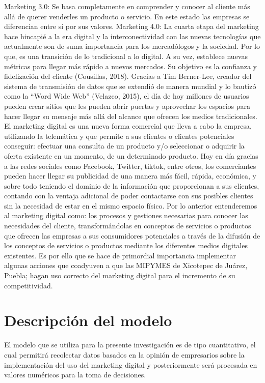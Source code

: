 \documentclass[12pt]{difu100cia} %
\begin{document}
Marketing 3.0: Se basa completamente en comprender y conocer al cliente más allá de querer venderles un producto o servicio. En este estado las empresas se diferencian entre sí por sus valores. 
Marketing 4.0: La cuarta etapa del marketing hace hincapié a la era digital y la interconectividad con las nuevas tecnologías que actualmente son de suma importancia para los mercadólogos y la sociedad. Por lo que, es una transición de lo tradicional a lo digital. A su vez, establece nuevas métricas para llegar más rápido a nuevos mercados. Su objetivo es la confianza y fidelización del cliente (Cousillas, 2018).
Gracias a Tim Berner-Lee, creador del sistema de transmisión de datos que se extendió de manera mundial y lo bautizó como la “Word Wide Web”  (Velazco, 2015), el día de hoy millones de usuarios pueden crear sitios que les pueden abrir puertas y aprovechar los espacios para hacer llegar su mensaje más allá del alcance que ofrecen los medios tradicionales. 
El marketing digital es una nueva forma comercial que lleva a cabo la empresa, utilizando la telemática y que permite a sus clientes o clientes potenciales conseguir: efectuar una consulta de un producto y/o seleccionar o adquirir la oferta existente en un momento, de un determinado producto. 
Hoy en día gracias a las redes sociales como Facebook, Twitter, tiktok, entre otros, los comerciantes pueden hacer llegar su publicidad de una manera más fácil, rápida, económica, y sobre todo teniendo el dominio de la información que proporcionan a sus clientes, contando con la ventaja adicional de poder contactarse con sus posibles clientes sin la necesidad de estar en el mismo espacio físico. 
Por lo anterior entenderemos al marketing digital como: los procesos y gestiones necesarias para conocer las necesidades del cliente, transformándolas en conceptos de servicios o productos que ofrecen las empresas a sus consumidores potenciales a través de la difusión de los conceptos de servicios o productos mediante los diferentes medios digitales existentes. Es por ello que se hace de primordial importancia implementar algunas acciones que coadyuven a que las MIPYMES de Xicotepec de Juárez, Puebla; hagan uso correcto del marketing digital para el incremento de su competitividad.

\section{Descripción del modelo}

El modelo que se utiliza para la presente investigación es de tipo cuantitativo, el cual permitirá recolectar datos basados en la opinión de empresarios sobre la implementación del uso del marketing digital y posteriormente será procesada en valores numéricos para la toma de decisiones. 
\end{document}
